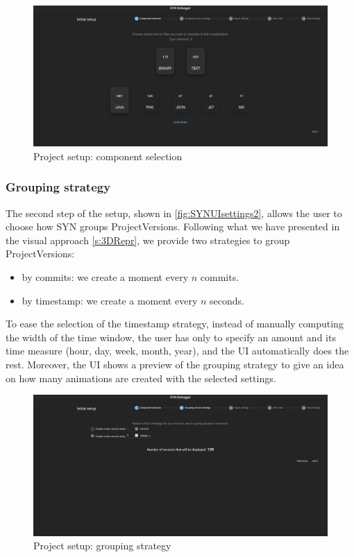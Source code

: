 \begin{figure}
    \center
    \includegraphics[width=\textwidth]{SYNUI-settings1.png}
    \caption{Project setup: component selection}
    \label{fig:SYNUIsettings1}
\end{figure}


\subsubsection*{Grouping strategy}
The second step of the setup, shown in \autoref{fig:SYNUIsettings2}, allows the user to choose how SYN groups ProjectVersions. 
Following what we have presented in the visual approach \autoref{s:3DRepr}, we provide two strategies to group ProjectVersions:
\begin{itemize}
    \item by commits: we create a moment every $n$ commits. 
    \item by timestamp: we create a moment every $n$ seconds. 
\end{itemize}

To ease the selection of the timestamp strategy, instead of manually computing the width of the time window, the user has only to specify an amount and its time measure (hour, day, week, month, year), and the UI automatically does the rest. 
Moreover, the UI shows a preview of the grouping strategy to give an idea on how many animations are created with the selected settings. 
\begin{figure}
    \center
    \includegraphics[width=\textwidth]{SYNUI-settings2.png}
    \caption{Project setup: grouping strategy}
    \label{fig:SYNUIsettings2}
\end{figure}

